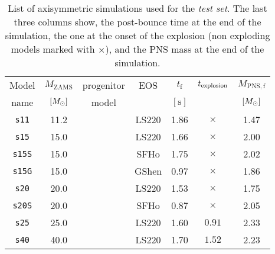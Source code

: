  \begin{table}
 \centering
 \begin{tabular}{c|ccc|ccc}
  \hline
  Model & $M_\mathrm{ZAMS} $ & progenitor& EOS & $t_{\mathrm{f}}$& $t_{\rm explosion}$ & $M_{\mathrm{PNS, f}}$\\
  name& $[M_{\odot}]$ & model & & $[\mathrm{s}]$& & $[M_{\odot}]$ 
  \\ 
  \hline
  \texttt{s11} & 11.2 & \cite{Woosley_Heger_Weaver__2002__ReviewsofModernPhysics__The_evolution_and_explosion_of_massive_stars}& LS220 & 1.86 & $\times$ & 1.47 
  \\ 
  \texttt{s15} & 15.0 & \cite{Woosley_Heger_Weaver__2002__ReviewsofModernPhysics__The_evolution_and_explosion_of_massive_stars}& LS220 & 1.66 & $\times$ & 2.00 
    \\ 
  \texttt{s15S} & 15.0 & \cite{Woosley_Heger_Weaver__2002__ReviewsofModernPhysics__The_evolution_and_explosion_of_massive_stars}& SFHo & 1.75 & $\times$ & 2.02 
    \\ 
  \texttt{s15G} & 15.0 & \cite{Woosley_Heger_Weaver__2002__ReviewsofModernPhysics__The_evolution_and_explosion_of_massive_stars}& GShen & 0.97 & $\times$ & 1.86
     \\ 
  \texttt{s20} & 20.0 & \cite{Woosley_Heger_Weaver__2002__ReviewsofModernPhysics__The_evolution_and_explosion_of_massive_stars}& LS220 & 1.53 & $\times$ & 1.75 
    \\ 
  \texttt{s20S} & 20.0 & \cite{Woosley_Heger__2007__physrep__Nucleosynthesisandremnantsinmassivestarsofsolarmetallicity} & SFHo & 0.87 & $\times$ & 2.05 
  \\ 
  \texttt{s25} & 25.0 & \cite{Woosley_Heger_Weaver__2002__ReviewsofModernPhysics__The_evolution_and_explosion_of_massive_stars}& LS220 & 1.60 & $0.91$ & 2.33 
    \\ 
  \texttt{s40} & 40.0 & \cite{Woosley_Heger_Weaver__2002__ReviewsofModernPhysics__The_evolution_and_explosion_of_massive_stars}& LS220 & 1.70 & $1.52$ & 2.23 
    \\ \hline
 \end{tabular}
 \caption{%
  List of axisymmetric simulations {used for the {\it test set}}. 
  {The last three columns show, the post-bounce time at the end of the
  simulation, the one at the onset of the explosion (non exploding models marked
  with $\times$), and the PNS mass at the end of the simulation.}
 }
 \label{Tab:2dSimList}
\end{table}

